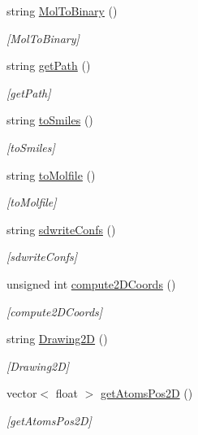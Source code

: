 \begin{DoxyCompactItemize}
string \mbox{\hyperlink{class_molecule_a49bb8305f51929c61864c2f2d7099c3f}{Mol\+To\+Binary}} ()
\begin{DoxyCompactList}\small\item\em \mbox{[}Mol\+To\+Binary\mbox{]} \end{DoxyCompactList}\item 
string \mbox{\hyperlink{class_molecule_a5d97408c9357663ceb2b2bff4471c602}{get\+Path}} ()
\begin{DoxyCompactList}\small\item\em \mbox{[}get\+Path\mbox{]} \end{DoxyCompactList}\item 
string \mbox{\hyperlink{class_molecule_a0ccd79755ccd96be3d17eacfe77b1a07}{to\+Smiles}} ()
\begin{DoxyCompactList}\small\item\em \mbox{[}to\+Smiles\mbox{]} \end{DoxyCompactList}\item 
string \mbox{\hyperlink{class_molecule_abf1fa50884e0dc53421416c3731689db}{to\+Molfile}} ()
\begin{DoxyCompactList}\small\item\em \mbox{[}to\+Molfile\mbox{]} \end{DoxyCompactList}\item 
string \mbox{\hyperlink{class_molecule_a4c3f4a82ffe6453c231d78aef0af5efd}{sdwrite\+Confs}} ()
\begin{DoxyCompactList}\small\item\em \mbox{[}sdwrite\+Confs\mbox{]} \end{DoxyCompactList}\item 
unsigned int \mbox{\hyperlink{class_molecule_a0add82d890a92f6b9cab8099becf966f}{compute2\+D\+Coords}} ()
\begin{DoxyCompactList}\small\item\em \mbox{[}compute2\+D\+Coords\mbox{]} \end{DoxyCompactList}\item 
string \mbox{\hyperlink{class_molecule_a7048877e6bd7ac8c34f760ce9e92dc31}{Drawing2D}} ()
\begin{DoxyCompactList}\small\item\em \mbox{[}Drawing2D\mbox{]} \end{DoxyCompactList}\item 
vector$<$ float $>$ \mbox{\hyperlink{class_molecule_aa995ba2f208be94be9d1bbb756cb1e91}{get\+Atoms\+Pos2D}} ()
\begin{DoxyCompactList}\small\item\em \mbox{[}get\+Atoms\+Pos2D\mbox{]} \end{DoxyCompactList}\item 

\end{DoxyCompactItemize}
